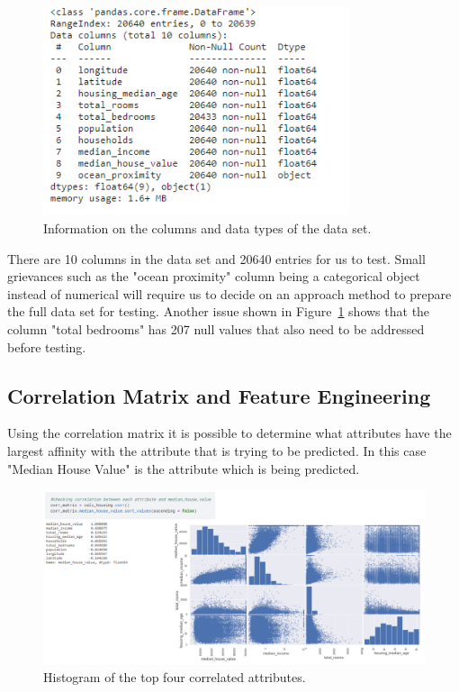 \documentclass{article}
\begin{document}
\begin{figure}[H]
\includegraphics[width=9.0cm]{Images/housing_info.png}
\caption{\label{fig:housing_info}Information on the columns and data types of the data set.}
\end{figure}

There are 10 columns in the data set and 20640 entries for us to test. Small grievances such as the "ocean proximity" column being a categorical object instead of numerical will require us to decide on an approach method to prepare the full data set for testing. Another issue shown in Figure~\ref{fig:housing_info} shows that the column "total bedrooms" has 207 null values that also need to be addressed before testing.

\subsection{Correlation Matrix and Feature Engineering}

Using the correlation matrix it is possible to determine what attributes have the largest affinity with the attribute that is trying to be predicted. In this case "Median House Value" is the attribute which is being predicted.

\begin{figure}[H]
\includegraphics[width=12.5cm]{Images/correlation histogram.png}
\caption{\label{fig:correlation histogram}Histogram of the top four correlated attributes.}
\end{figure}
\end{document}
